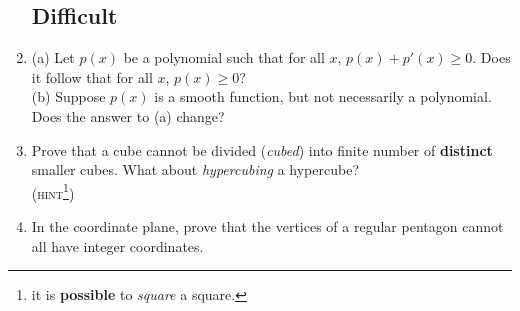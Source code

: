 \documentclass[12pt]{article}
\begin{document}
\begin{enumerate}
	\subsection*{Difficult}
	\item{(a) Let $p(x)$ be a polynomial such that for all $x$, $p(x) + p'(x) \ge 0$. Does it follow that for all $x$, $p(x) \ge 0$?
\\(b) Suppose $p(x)$ is a smooth function, but not necessarily a polynomial. Does the answer to (a) change?}
	
	\item{Prove that a cube cannot be divided (\emph{cubed}) into finite number of \textbf{distinct} smaller cubes. What about \emph{hypercubing} a hypercube? \\
(\textsc{hint\footnote{it is \textbf{possible} to \emph{square} a square.})}}
	
	\item{In the coordinate plane, prove that the vertices of a regular pentagon cannot all have integer coordinates.}

\end{enumerate}
\end{document}
